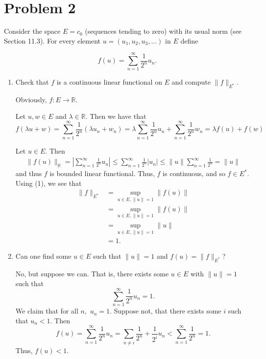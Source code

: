 \documentclass[11pt]{article}
\newcommand{\bbR}{\mathbb{R}}
\begin{document}
\section*{Problem 2}
\begin{problem}
    Consider the space \( E = c_0 \) (sequences tending to zero) with its usual norm (see Section 11.3). For every element \( u = (u_1, u_2, u_3, \ldots) \) in \( E \) define


\[ 
f(u) = \sum_{n=1}^{\infty} \frac{1}{2^n} u_n. 
\]



\begin{enumerate}
    \item Check that \( f \) is a continuous linear functional on \( E \) and compute \( \|f\|_{E^*} \).
\begin{solution}
    Obviously, $f: E \to \bbR.$ 

    Let $u, w \in E$ and $\lambda\in \bbR.$ Then we have that 
    \[f(\lambda  u + w) = \sum_{n=1}^{\infty} \frac{1}{2^n} (\lambda u_n + w_n) = \lambda \sum_{n=1}^{\infty} \frac{1}{2^n} u_n + \sum_{n=1}^{\infty} \frac{1}{2^n} w_n = \lambda f(u) + f(w)\]

    Let $u\in E.$ Then 
    \begin{align}
    \|f(u)\|_\bbR = |\sum_{n=1}^{\infty} \frac{1}{2^n} u_n| \leq \sum_{n=1}^{\infty} \frac{1}{2^n} |u_n| \leq \|u\|\sum_{n=1}^{\infty} \frac{1}{2^n}  = \|u\|    
    \end{align}
     and thus $f$ is bounded linear functional. Thus, $f$ is continuous, and so $f\in E^*.$ Using (1), we see that
    \begin{align*}
        \|f\|_{E^*} &= \sup_{u\in E, \|u\| = 1} \|f(u)\|\\
        &= \sup_{u\in E, \|u\| = 1} \|f(u)\|\\
        &= \sup_{u\in E, \|u\| = 1}\|u\|\\
        &= 1.
    \end{align*}
\end{solution}

    
    \item Can one find some \( u \in E \) such that \( \|u\| = 1 \) and \( f(u) = \|f\|_{E^*} \)?
    \begin{solution}
        No, but suppose we can. That is, there exists some $u \in E$ with $\|u\| = 1$ such that 
        \[\sum_{n=1}^{\infty} \frac{1}{2^n} u_n = 1.\] We claim that for all $n,$ $u_n = 1.$ Suppose not, that there exists some $i$ such that $u_n <1.$ Then 
        \[f(u) = \sum_{n = 1}^\infty \frac{1}{2^n}u_n = \sum_{n\neq i}\frac{1}{2^n} + \frac{1}{2^i}u_n < \sum_{n=1}^\infty \frac{1}{2^n} = 1.\] Thus, $f(u) < 1.$ 
    \end{solution}
    

\end{enumerate}
\end{problem}
\end{document}
